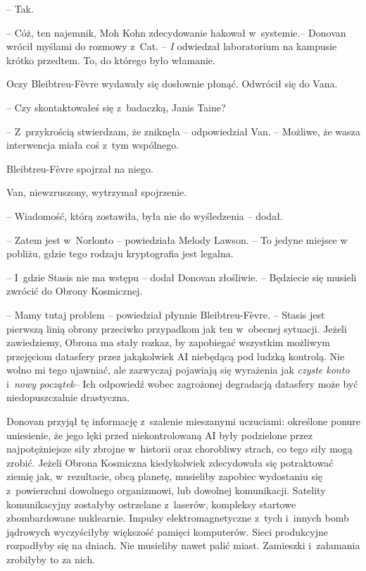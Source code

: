 \documentclass[oneside,polish,11pt,sfheadings]{mwbk}
\begin{document}
-- Tak.

-- Cóż, ten najemnik, Moh Kohn zdecydowanie hakował w~systemie.-- Donovan
wrócił myślami do rozmowy z~Cat. -- \emph{I} odwiedzał laboratorium na
kampusie krótko przedtem. To, do którego było włamanie.

Oczy Bleibtreu-Fèvre wydawały się dosłownie płonąć. Odwrócił się do
Vana.

-- Czy skontaktowałeś się z~badaczką, Janis Taine?

-- Z~przykrością stwierdzam, że zniknęła -- odpowiedział Van. -- Możliwe,
że wasza interwencja miała coś z~tym wspólnego.

Bleibtreu-Fèvre spojrzał na niego.

Van, niewzruszony, wytrzymał spojrzenie. 

-- Wiadomość, którą zostawiła,
była nie do wyśledzenia -- dodał.

-- Zatem jest w~Norlonto -- powiedziała Melody Lawson. -- To jedyne miejsce
w pobliżu, gdzie tego rodzaju kryptografia jest legalna.

-- I~gdzie Stasis nie ma wstępu -- dodał Donovan złośliwie. -- Będziecie
się musieli zwrócić do Obrony Kosmicznej.

-- Mamy tutaj problem -- powiedział płynnie Bleibtreu-Fèvre. -- Stasis jest
pierwszą linią obrony przeciwko przypadkom jak ten w~obecnej sytuacji.
Jeżeli zawiedziemy, Obrona ma stały rozkaz, by zapobiegać wszystkim
możliwym przejęciom datasfery przez jakąkolwiek AI niebędącą pod ludzką
kontrolą. Nie wolno mi tego ujawniać, ale zazwyczaj pojawiają się
wyrażenia jak \emph{czyste konto} i~\emph{nowy początek}-- Ich odpowiedź
wobec zagrożonej degradacją datasfery może być niedopuszczalnie
drastyczna.

Donovan przyjął tę informację z~szalenie mieszanymi uczuciami: określone
ponure uniesienie, że jego lęki przed niekontrolowaną AI były podzielone
przez najpotężniejsze siły zbrojne w~historii oraz chorobliwy strach, co
tego siły mogą zrobić. Jeżeli Obrona Kosmiczna kiedykolwiek zdecydowała
się potraktować ziemię jak, w~rezultacie, obcą planetę, musieliby
zapobiec wydostaniu się z~powierzchni dowolnego organizmowi, lub
dowolnej komunikacji. Satelity komunikacyjny zostałyby ostrzelane z~laserów, kompleksy startowe zbombardowane nuklearnie. Impulsy
elektromagnetyczne z~tych i~innych bomb jądrowych wyczyściłyby większość
pamięci komputerów. Sieci produkcyjne rozpadłyby się na dniach. Nie
musieliby nawet palić miast. Zamieszki i~załamania zrobiłyby to za nich.
\end{document}

